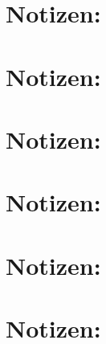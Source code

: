 \section*{Notizen:}
\hfill
\clearpage
\thispagestyle{empty}
\section*{Notizen:}
\hfill
\clearpage
\thispagestyle{empty}
\section*{Notizen:}
\hfill
\clearpage
\thispagestyle{empty}
\section*{Notizen:}
\hfill
\clearpage
\thispagestyle{empty}
\section*{Notizen:}
\hfill
\clearpage
\thispagestyle{empty}
\section*{Notizen:}
\hfill
\clearpage
\thispagestyle{empty}
\hfill
\clearpage
